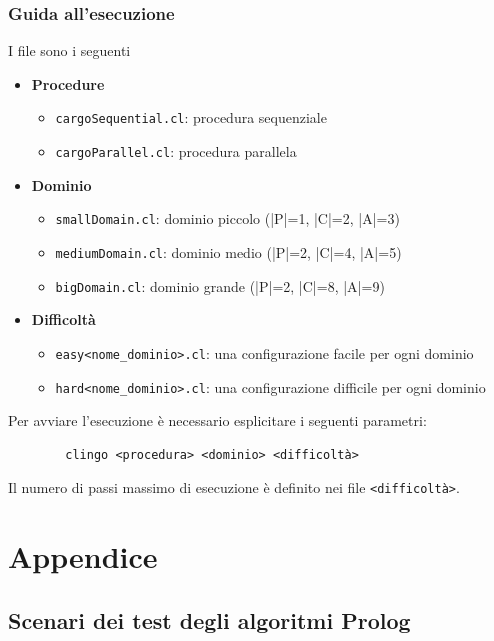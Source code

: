 \documentclass[a4paper,oneside,12pt]{book}
\begin{document}
    \subsubsection*{Guida all'esecuzione}
    I file sono i seguenti
    \begin{itemize}
        \item \textbf{Procedure}
        \begin{itemize}
            \item \texttt{cargoSequential.cl}: procedura sequenziale
            \item \texttt{cargoParallel.cl}: procedura parallela
        \end{itemize}
        \item \textbf{Dominio}
        \begin{itemize}
            \item \texttt{smallDomain.cl}: dominio piccolo (|P|=1, |C|=2, |A|=3)
            \item \texttt{mediumDomain.cl}: dominio medio (|P|=2, |C|=4, |A|=5)
            \item \texttt{bigDomain.cl}: dominio grande (|P|=2, |C|=8, |A|=9)
        \end{itemize}
        \item \textbf{Difficoltà}
        \begin{itemize}
            \item \texttt{easy<nome\_dominio>.cl}: una configurazione facile per ogni dominio
            \item \texttt{hard<nome\_dominio>.cl}: una configurazione difficile per ogni dominio
        \end{itemize}
    \end{itemize}
    Per avviare l'esecuzione è necessario esplicitare i seguenti parametri:
    \begin{verbatim}
        clingo <procedura> <dominio> <difficoltà>
    \end{verbatim}
    Il numero di passi massimo di esecuzione è definito nei file \texttt{<difficoltà>}.
    \newpage
    \noindent

    \section*{Appendice}
    \subsection*{Scenari dei test degli algoritmi Prolog}
\end{document}
